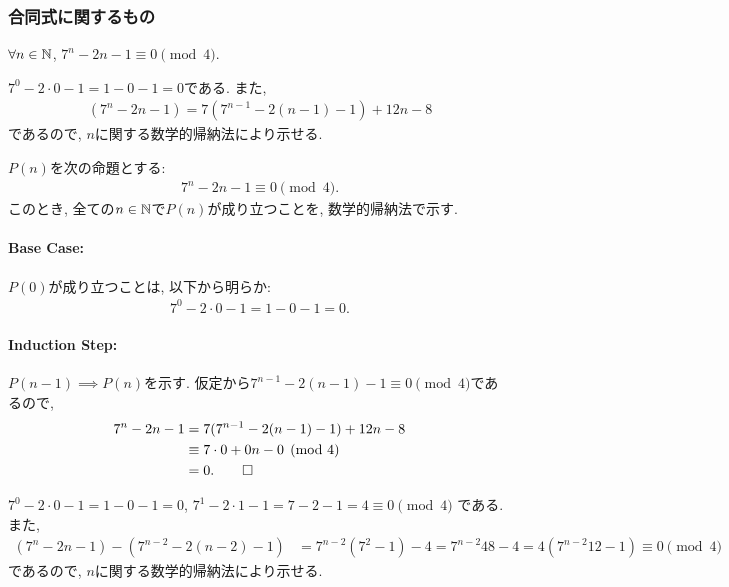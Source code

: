 \subsubsection{合同式に関するもの}
\begin{prop}
  \label{p:20230801}
  $\forall n\in \mathbb{N}$,
  $7^n-2n-1\equiv 0\pmod{4}$.
\end{prop}
\begin{proof**}
  $7^0-2\cdot 0-1=1-0-1=0$である.
  また,
  \begin{align*}
    (7^n-2n-1)=7(7^{n-1}-2(n-1)-1)+12n-8
  \end{align*}
  であるので,
  $n$に関する数学的帰納法により示せる.
\end{proof**}

\begin{proof*}
  $P(n)$を次の命題とする:
  \begin{align*}
    7^n-2n-1\equiv 0\pmod{4}
    .
  \end{align*}
  このとき,
  全ての$n\in\mathbb{N}$で$P(n)$が成り立つことを,
  数学的帰納法で示す.

  \paragraph{Base Case:}
  $P(0)$が成り立つことは, 以下から明らか:
  \begin{align*}
    7^0-2\cdot 0-1=1-0-1= 0.
  \end{align*}

  \paragraph{Induction Step:}
  $P(n-1)\implies P(n)$を示す.
  仮定から$7^{n-1}-2(n-1)-1\equiv 0\pmod{4}$であるので,
  \begin{align*}
    7^n-2n-1
    &=7(7^{n-1}-2(n-1)-1)+12n-8\\
    &\equiv 7\cdot 0+0n-0\pmod{4}\\
    &=0
    .\qedhere
  \end{align*}
\end{proof*}

\begin{proof**}
  $7^0-2\cdot 0-1=1-0-1=0$,
  $7^1-2\cdot 1-1=7-2-1=4\equiv 0\pmod{4}$
  である.
  また,
  \begin{align*}
    (7^n-2n-1)-(7^{n-2}-2(n-2)-1)
    &=7^{n-2}(7^2-1)-4
    =7^{n-2}48-4
    =4(7^{n-2}12-1)
    \equiv 0 \pmod{4}
  \end{align*}
  であるので,
  $n$に関する数学的帰納法により示せる.
\end{proof**}


